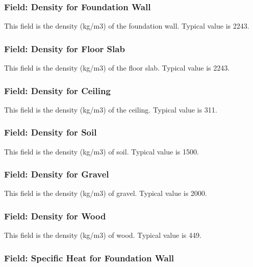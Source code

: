 \subsubsection{Field: Density for Foundation Wall}\label{field-density-for-foundation-wall}

This field is the density (kg/m3) of the foundation wall. Typical value is 2243.

\subsubsection{Field: Density for Floor Slab}\label{field-density-for-floor-slab}

This field is the density (kg/m3) of the floor slab. Typical value is 2243.

\subsubsection{Field: Density for Ceiling}\label{field-density-for-ceiling}

This field is the density (kg/m3) of the ceiling. Typical value is 311.

\subsubsection{Field: Density for Soil}\label{field-density-for-soil}

This field is the density (kg/m3) of soil. Typical value is 1500.

\subsubsection{Field: Density for Gravel}\label{field-density-for-gravel}

This field is the density (kg/m3) of gravel. Typical value is 2000.

\subsubsection{Field: Density for Wood}\label{field-density-for-wood}

This field is the density (kg/m3) of wood. Typical value is 449.

\subsubsection{Field: Specific Heat for Foundation Wall}\label{field-specific-heat-for-foundation-wall}

